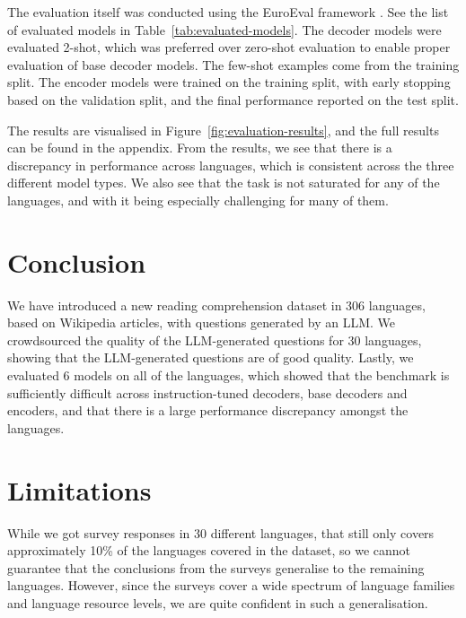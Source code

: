 \documentclass[10pt, a4paper]{article}
\begin{document}
The evaluation itself was conducted using the EuroEval framework \cite{nielsen-2023-scandeval,saattrup-nielsen-etal-2025-encoder}. See the list of evaluated models in Table~\ref{tab:evaluated-models}. The decoder models were evaluated 2-shot, which was preferred over zero-shot evaluation to enable proper evaluation of base decoder models. The few-shot examples come from the training split. The encoder models were trained on the training split, with early stopping based on the validation split, and the final performance reported on the test split.

The results are visualised in Figure~\ref{fig:evaluation-results}, and the full results can be found in the appendix. From the results, we see that there is a discrepancy in performance across languages, which is consistent across the three different model types. We also see that the task is not saturated for any of the languages, and with it being especially challenging for many of them.




\section{Conclusion}
\label{sec:conclusion}

We have introduced a new reading comprehension dataset in 306 languages, based on Wikipedia articles, with questions generated by an LLM. We crowdsourced the quality of the LLM-generated questions for 30 languages, showing that the LLM-generated questions are of good quality. Lastly, we evaluated 6 models on all of the languages, which showed that the benchmark is sufficiently difficult across instruction-tuned decoders, base decoders and encoders, and that there is a large performance discrepancy amongst the languages.


\section*{Limitations}
\label{sec:limitations}

While we got survey responses in 30 different languages, that still only covers approximately 10\% of the languages covered in the dataset, so we cannot guarantee that the conclusions from the surveys generalise to the remaining languages. However, since the surveys cover a wide spectrum of language families and language resource levels, we are quite confident in such a generalisation.
\end{document}
